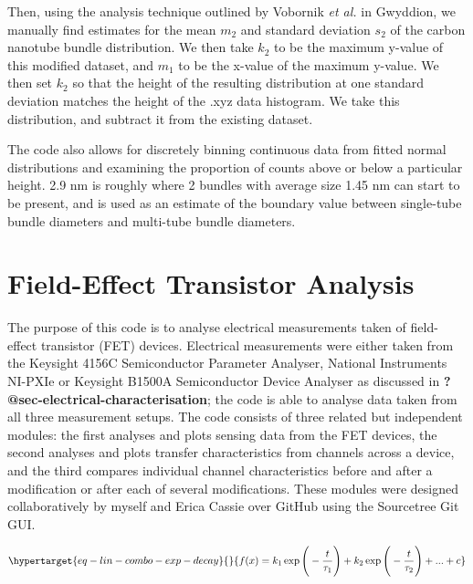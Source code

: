 \documentclass[
  a4paper,
]{scrbook}
\begin{document}
Then, using the analysis technique outlined by Vobornik \emph{et al.}
\autocite{Vobornik2023} in Gwyddion, we manually find estimates for the
mean \(m_2\) and standard deviation \(s_2\) of the carbon nanotube
bundle distribution. We then take \(k_2\) to be the maximum y-value of
this modified dataset, and \(m_1\) to be the x-value of the maximum
y-value. We then set \(k_2\) so that the height of the resulting
distribution at one standard deviation matches the height of the .xyz
data histogram. We take this distribution, and subtract it from the
existing dataset.

The code also allows for discretely binning continuous data from fitted
normal distributions and examining the proportion of counts above or
below a particular height. 2.9 nm is roughly where 2 bundles with
average size 1.45 nm can start to be present, and is used as an estimate
of the boundary value between single-tube bundle diameters and
multi-tube bundle diameters.

\hypertarget{sec-field-effect-transistor-analysis}{%
\section{Field-Effect Transistor
Analysis}\label{sec-field-effect-transistor-analysis}}

The purpose of this code is to analyse electrical measurements taken of
field-effect transistor (FET) devices. Electrical measurements were
either taken from the Keysight 4156C Semiconductor Parameter Analyser,
National Instruments NI-PXIe or Keysight B1500A Semiconductor Device
Analyser as discussed in \textbf{?@sec-electrical-characterisation}; the
code is able to analyse data taken from all three measurement setups.
The code consists of three related but independent modules: the first
analyses and plots sensing data from the FET devices, the second
analyses and plots transfer characteristics from channels across a
device, and the third compares individual channel characteristics before
and after a modification or after each of several modifications. These
modules were designed collaboratively by myself and Erica Cassie over
GitHub using the Sourcetree Git GUI.

\begin{equation}\protect\hypertarget{eq-lin-combo-exp-decay}{}{
f(x) = k_1\exp{\Bigg(-\frac{t}{{\tau}_{1}}\Bigg)} + k_2\exp{\Bigg(-\frac{t}{{\tau}_{2}}\Bigg)} + ... + c
}\label{eq-lin-combo-exp-decay}\end{equation}
\end{document}
